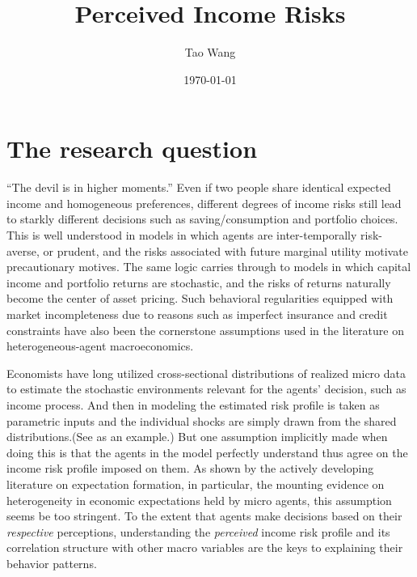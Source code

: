 \documentclass[12pt,notitlepage,onecolumn,aps,pra]{article}
\begin{document}
    
    
    \title{Perceived Income Risks}\author{Tao Wang}

\date{\today}
\maketitle


    
    

    
    \hypertarget{the-research-question}{%
\section{The research question}\label{the-research-question}}

``The devil is in higher moments.'' Even if two people share identical
expected income and homogeneous preferences, different degrees of income
risks still lead to starkly different decisions such as
saving/consumption and portfolio choices. This is well understood in
models in which agents are inter-temporally risk-averse, or prudent, and
the risks associated with future marginal utility motivate precautionary
motives. The same logic carries through to models in which capital
income and portfolio returns are stochastic, and the risks of returns
naturally become the center of asset pricing. Such behavioral
regularities equipped with market incompleteness due to reasons such as
imperfect insurance and credit constraints have also been the
cornerstone assumptions used in the literature on heterogeneous-agent
macroeconomics.

Economists have long utilized cross-sectional distributions of realized
micro data to estimate the stochastic environments relevant for the
agents' decision, such as income process. And then in modeling the
estimated risk profile is taken as parametric inputs and the individual
shocks are simply drawn from the shared distributions.(See
\cite{blundell_consumption_2008} as an example.) But one assumption
implicitly made when doing this is that the agents in the model
perfectly understand thus agree on the income risk profile imposed on
them. As shown by the actively developing literature on expectation
formation, in particular, the mounting evidence on heterogeneity in
economic expectations held by micro agents, this assumption seems be too
stringent. To the extent that agents make decisions based on their
\emph{respective} perceptions, understanding the \emph{perceived} income
risk profile and its correlation structure with other macro variables
are the keys to explaining their behavior patterns.
\end{document}

